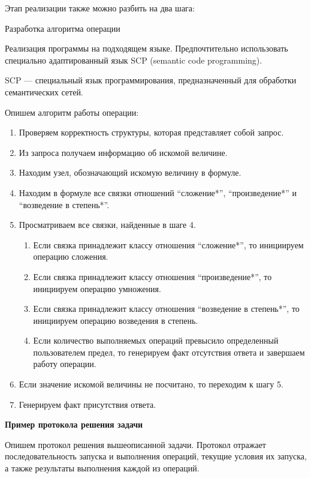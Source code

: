 Этап реализации также можно разбить на два шага:

\begin{textitemize}
	\item Разработка алгоритма операции
	\item Реализация программы на подходящем языке. Предпочтительно использовать специально адаптированный язык SCP (semantic code programming).
\end{textitemize}

SCP --- специальный язык программирования, предназначенный для обработки семантических сетей.

Опишем алгоритм работы операции:

\begin{enumerate}
	\item
	Проверяем корректность структуры, которая представляет собой запрос.
	\item
	Из запроса получаем информацию об искомой величине.
	\item
	Находим узел, обозначающий искомую величину в формуле.
	\item
	Находим в формуле все связки отношений ``сложение*'', ``произведение*'' и ``возведение в степень*''.
	\item
	Просматриваем все связки, найденные в шаге 4.
	
	\begin{enumerate}
		\def\labelenumii{\arabic{enumii}.}
		\item
		Если связка принадлежит классу отношения ``сложение*'', то инициируем операцию сложения.
		\item
		Если связка принадлежит классу отношения ``произведение*'', то инициируем операцию умножения.
		\item
		Если связка принадлежит классу отношения ``возведение в степень*'', то инициируем операцию возведения в степень.
		\item
		Если количество выполняемых операций превысило определенный пользователем предел, то генерируем факт отсутствия ответа и завершаем работу операции.
	\end{enumerate}
	\item
	Если значение искомой величины не посчитано, то переходим к шагу 5.
	\item
	Генерируем факт присутствия ответа.
\end{enumerate}

\textbf{Пример протокола решения задачи}

Опишем протокол решения вышеописанной задачи. Протокол отражает последовательность запуска и выполнения операций, текущие условия их запуска, а также результаты выполнения каждой из операций.

